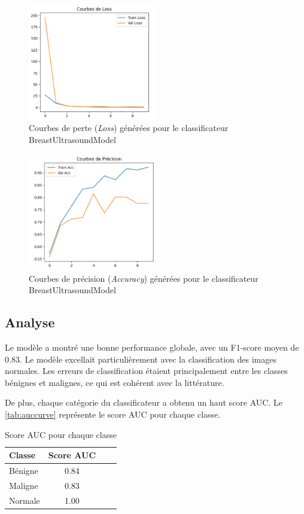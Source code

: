 \documentclass[a4paper,12pt]{article}
\begin{document}
\clearpage
\begin{figure}[h]
\centering
\includegraphics[width=0.5\textwidth]{loss_curve.png}
\caption{Courbes de perte (\textit{Loss}) générées pour le classificateur BreastUltrasoundModel}
\label{fig:losscurve}
\end{figure}

\begin{figure}[h]
\centering
\includegraphics[width=0.5\textwidth]{accuracy_curve.png}
\caption{Courbes de précision (\textit{Accuracy}) générées pour le classificateur BreastUltrasoundModel}
\label{fig:accuracycurve}
\end{figure}


\subsection{Analyse}
Le modèle a montré une bonne performance globale, avec un F1-score moyen de 0.83. Le modèle excellait particulièrement avec la classification des images normales. Les erreurs de classification étaient principalement entre les classes bénignes et malignes, ce qui est cohérent avec la littérature.

De plus, chaque catégorie du classificateur a obtenu un haut score AUC. Le \autoref{tab:auccurve} représente le score AUC pour chaque classe.

\begin{table}[h]
\centering
\caption{Score AUC pour chaque classe}
\begin{tabular}{lccc}
\toprule
Classe & Score AUC \\
\midrule
Bénigne & 0.84 \\
Maligne & 0.83 \\
Normale & 1.00 \\
\bottomrule
\end{tabular}
\label{tab:auccurve}
\end{table}
\end{document}
